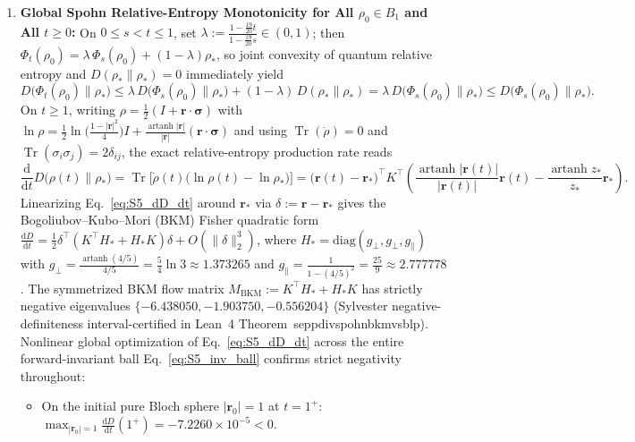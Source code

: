 \documentclass[onecolumn,10pt,notitlepage,amsmath,amssymb,floatfix]{revtex4-2}
\theoremstyle{plain}
\theoremstyle{definition}
\newcommand{\dd}{\mathrm{d}}
\newcommand{\Tr}{\operatorname{Tr}}
\newcommand{\leanid}[1]{{\footnotesize\ttfamily\def\_{\textunderscore\penalty0\hspace{0pt}}#1}}
\begin{document}
\begin{enumerate}[label=(\roman*),leftmargin=1.8em,itemsep=2pt]
\item \textbf{Global Spohn Relative-Entropy Monotonicity for All $\rho_0 \in B_1$ and All $t \ge 0$:}
On $0 \le s < t \le 1$, set $\lambda := \frac{1-\frac{19}{20}t}{1-\frac{19}{20}s} \in (0,1)$; then $\Phi_t(\rho_0) = \lambda\,\Phi_s(\rho_0) + (1-\lambda)\rho_*$, so joint convexity of quantum relative entropy and $D(\rho_*\parallel\rho_*) = 0$ immediately yield
\[
D\big(\Phi_t(\rho_0)\parallel\rho_*\big)
\le \lambda\,D\big(\Phi_s(\rho_0)\parallel\rho_*\big) + (1-\lambda)\,D(\rho_*\parallel\rho_*)
= \lambda\,D\big(\Phi_s(\rho_0)\parallel\rho_*\big)
\le D\big(\Phi_s(\rho_0)\parallel\rho_*\big).
\]
On $t \ge 1$, writing $\rho = \frac{1}{2}(I + \mathbf{r}\cdot\boldsymbol{\sigma})$ with $\ln\rho = \frac{1}{2}\ln\!\big(\frac{1-|\mathbf{r}|^2}{4}\big)I + \frac{\operatorname{artanh}|\mathbf{r}|}{|\mathbf{r}|}(\mathbf{r}\cdot\boldsymbol{\sigma})$ and using $\Tr(\dot{\rho}) = 0$ and $\Tr(\sigma_i\sigma_j) = 2\delta_{ij}$, the exact relative-entropy production rate reads
\begin{equation}
\label{eq:S5_dD_dt}
\frac{\dd}{\dd t} D\big(\rho(t)\parallel\rho_*\big)
= \Tr\Big[\dot{\rho}(t)\big(\ln\rho(t) - \ln\rho_*\big)\Big]
= \big(\mathbf{r}(t) - \mathbf{r}_*\big)^\top K^\top
\left(\frac{\operatorname{artanh}|\mathbf{r}(t)|}{|\mathbf{r}(t)|}\mathbf{r}(t)
- \frac{\operatorname{artanh} z_*}{z_*}\mathbf{r}_*\right).
\end{equation}
Linearizing Eq.~\eqref{eq:S5_dD_dt} around $\mathbf{r}_*$ via $\delta := \mathbf{r} - \mathbf{r}_*$ gives the Bogoliubov--Kubo--Mori (BKM) Fisher quadratic form $\frac{\dd D}{\dd t} = \frac{1}{2}\delta^\top(K^\top H_* + H_* K)\delta + O(\|\delta\|_2^3)$, where $H_* = \mathrm{diag}(g_\perp, g_\perp, g_\parallel)$ with $g_\perp = \frac{\operatorname{artanh}(4/5)}{4/5} = \frac{5}{4}\ln 3 \approx 1.373265$ and $g_\parallel = \frac{1}{1 - (4/5)^2} = \frac{25}{9} \approx 2.777778$. The symmetrized BKM flow matrix $M_{\mathrm{BKM}} := K^\top H_* + H_* K$ has strictly negative eigenvalues $\{-6.438050, -1.903750, -0.556204\}$ (Sylvester negative-definiteness interval-certified in Lean~4 Theorem~\leanid{sep\_pdiv\_spohn\_bkm\_vs\_blp}). Nonlinear global optimization of Eq.~\eqref{eq:S5_dD_dt} across the entire forward-invariant ball Eq.~\eqref{eq:S5_inv_ball} confirms strict negativity throughout:
\begin{itemize}[leftmargin=1.4em,itemsep=1pt]
\item On the initial pure Bloch sphere $|\mathbf{r}_0| = 1$ at $t = 1^+$: $\max_{|\mathbf{r}_0|=1}\frac{\dd D}{\dd t}(1^+) = -7.2260\times 10^{-5} < 0$.

\end{itemize}
\end{enumerate}
\end{document}
